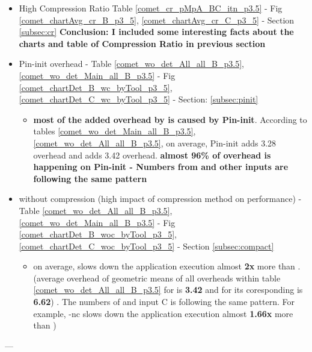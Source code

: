 {\begin{itemize}
\begin{itemize}
	\item \textsf{\textbf{\parlotm vs. \callgrind} Above story is true also for \parlotm. According to table \ref{comet_cr_pMpA_BC_itn_p3.5}, for \parlotm where the average compression ratio for input C is 1117.01, and the correspondent required bandwidth which is 7.84 kB/s, shows that \parlotm can collect \textbf{more than 8.5 MB} worth of data per core per second where it only needs \textbf{7.84.38 kB/s} bandwidth, while \callgrind can only collects \textbf{less than 100 kB} of informative data and still adds more overhead comparing to either \parlota or \parlotm. \textbf{Conclusion: The amount of informative data can be collected with \parlotm  are 85x larger than \callgrind and the overhead \parlotm adds is about 0.4x smaller than \callgrind}}
	\end{itemize}
	
	
\item \textsf{High Compression Ratio Table \ref{comet_cr_pMpA_BC_itn_p3.5} - Fig \ref{comet_chartAvg_cr_B_p3_5}, \ref{comet_chartAvg_cr_C_p3_5} - Section \ref{subsec:cr}
\textbf{Conclusion: I included some interesting facts about the charts and table of Compression Ratio in previous section}}
\item \textsf{ Pin-init overhead - Table \ref{comet_wo_det_All_all_B_p3.5}, \ref{comet_wo_det_Main_all_B_p3.5} - Fig \ref{comet_chartDet_B_wc_byTool_p3_5}, \ref{comet_chartDet_C_wc_byTool_p3_5} - Section: \ref{subsec:pinit}}
	\begin{itemize}
	\item \textsf{\textbf{most of the added overhead by \parlot is caused by Pin-init}. According to tables \ref{comet_wo_det_Main_all_B_p3.5}, \ref{comet_wo_det_All_all_B_p3.5}, on average, Pin-init adds 3.28 overhead and \parlota adds 3.42 overhead. \textbf{almost 96\% of \parlota overhead is happening on Pin-init - Numbers from \parlotm and other inputs are following the same pattern}}
	\end{itemize}
\item \textsf{ \parlot without compression  (high impact of compression method on performance) - Table \ref{comet_wo_det_All_all_B_p3.5}, \ref{comet_wo_det_Main_all_B_p3.5}  - Fig \ref{comet_chartDet_B_woc_byTool_p3_5}, \ref{comet_chartDet_C_woc_byTool_p3_5} - Section \ref{subsec:compact}}

\begin{itemize}
\item \textsf{on average, \parlotnc slows down the application execution almost \textbf{2x} more than \parlota. (average overhead of geometric means of all overheads within table  \ref{comet_wo_det_All_all_B_p3.5} for \parlota is \textbf{3.42} and for its coresponding \parlotnc is \textbf{6.62}) . The numbers of \parlotm and input C is following the same pattern. For example, \parlot-nc slows down the application execution almost \textbf{1.66x} more than \parlotm)}
\end{itemize}
\end{itemize}

\vspace{1ex}

\vspace{1ex}
\vspace{1ex}
---}



